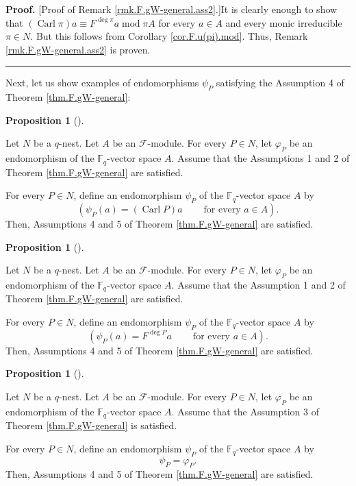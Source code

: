 \documentclass[numbers=enddot,12pt,final,onecolumn,notitlepage]{scrartcl}%
\theoremstyle{definition}
\newtheorem{prop}[theo]{Proposition}
\newenvironment{proposition}[1][]
{\begin{prop}[#1]\begin{leftbar}}
{\end{leftbar}\end{prop}}
\newenvironment{proof}[1][Proof]{\noindent\textbf{#1.} }{\ \rule{0.5em}{0.5em}}
\begin{document}
\begin{proof}
[Proof of Remark \ref{rmk.F.gW-general.ass2}.]It is clearly enough to show
that $\left(  \operatorname*{Carl}\pi\right)  a\equiv F^{\deg\pi
}a\operatorname{mod}\pi A$ for every $a\in A$ and every monic irreducible
$\pi\in N$. But this follows from Corollary \ref{cor.F.u(pi).mod}. Thus,
Remark \ref{rmk.F.gW-general.ass2} is proven.
\end{proof}

Next, let us show examples of endomorphisms $\psi_{P}$ satisfying the
Assumption 4 of Theorem \ref{thm.F.gW-general}:

\begin{proposition}
\label{prop.F.gW-general.ex1}Let $N$ be a $q$-nest. Let $A$ be an
$\mathcal{F}$-module. For every $P\in N$, let $\varphi_{P}$ be an endomorphism
of the $\mathbb{F}_{q}$-vector space $A$. Assume that the Assumptions 1 and 2
of Theorem \ref{thm.F.gW-general} are satisfied.

For every $P\in N$, define an endomorphism $\psi_{P}$ of the $\mathbb{F}_{q}%
$-vector space $A$ by%
\[
\left(  \psi_{P}\left(  a\right)  =\left(  \operatorname*{Carl}P\right)
a\ \ \ \ \ \ \ \ \ \ \text{for every }a\in A\right)  .
\]
Then, Assumptions 4 and 5 of Theorem \ref{thm.F.gW-general} are satisfied.
\end{proposition}

\begin{proposition}
\label{prop.F.gW-general.ex2}Let $N$ be a $q$-nest. Let $A$ be an
$\mathcal{F}$-module. For every $P\in N$, let $\varphi_{P}$ be an endomorphism
of the $\mathbb{F}_{q}$-vector space $A$. Assume that the Assumption 1 and 2
of Theorem \ref{thm.F.gW-general} are satisfied.

For every $P\in N$, define an endomorphism $\psi_{P}$ of the $\mathbb{F}_{q}%
$-vector space $A$ by%
\[
\left(  \psi_{P}\left(  a\right)  =F^{\deg P}a\ \ \ \ \ \ \ \ \ \ \text{for
every }a\in A\right)  .
\]
Then, Assumptions 4 and 5 of Theorem \ref{thm.F.gW-general} are satisfied.
\end{proposition}

\begin{proposition}
\label{prop.F.gW-general.ex3}Let $N$ be a $q$-nest. Let $A$ be an
$\mathcal{F}$-module. For every $P\in N$, let $\varphi_{P}$ be an endomorphism
of the $\mathbb{F}_{q}$-vector space $A$. Assume that the Assumption 3 of
Theorem \ref{thm.F.gW-general} is satisfied.

For every $P\in N$, define an endomorphism $\psi_{P}$ of the $\mathbb{F}_{q}%
$-vector space $A$ by%
\[
\psi_{P}=\varphi_{P}.
\]
Then, Assumptions 4 and 5 of Theorem \ref{thm.F.gW-general} are satisfied.
\end{proposition}
\end{document}
